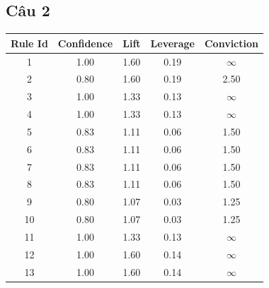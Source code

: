 \documentclass{article}
\begin{document}
\subsection{Câu 2}
\begin{table}[H]
	\centering
	\begin{tabular}{|c | c c c c|}
		\hline
		Rule Id & Confidence & Lift & Leverage & Conviction\\ \hline 
		1 & 1.00 & 1.60 & 0.19 & $\infty$ \\ 
		2 & 0.80 & 1.60 & 0.19 & 2.50 \\ 
		3 & 1.00 & 1.33 & 0.13 & $\infty$ \\ 
		4 & 1.00 & 1.33 & 0.13 & $\infty$ \\ 
		5 & 0.83 & 1.11 & 0.06 & 1.50 \\ 
		6 & 0.83 & 1.11 & 0.06 & 1.50 \\ 
		7 & 0.83 & 1.11 & 0.06 & 1.50 \\ 
		8 & 0.83 & 1.11 & 0.06 & 1.50 \\ 
		9 & 0.80 & 1.07 & 0.03 & 1.25 \\ 
		10 & 0.80 & 1.07 & 0.03 & 1.25 \\ 
		11 & 1.00 & 1.33 & 0.13 & $\infty$ \\ 
		12 & 1.00 & 1.60 & 0.14 & $\infty$ \\ 
		13 & 1.00 & 1.60 & 0.14 & $\infty$ \\ 

\end{tabular}
\end{table}
\end{document}
